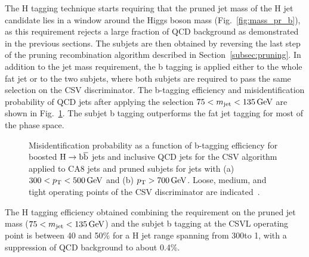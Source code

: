 The H tagging technique starts requiring that the pruned jet mass of the H jet candidate lies in a window around the Higgs boson mass (Fig.~\ref{fig:mass_pr_b}),
as this requirement rejects a large fraction of QCD background as demonstrated in the previous sections.
The subjets are then obtained by reversing the last step of the pruning recombination algorithm described in Section~\ref{subsec:pruning}.
In addition to the jet mass requirement, the b tagging is applied either to the whole fat jet or to the two subjets, where both subjets are required
to pass the same selection on the CSV discriminator. The b-tagging efficiency and misidentification probability of QCD jets after applying the selection $75 < m_{\text{jet}} < 135\,\text{Ge\hspace{-.08em}V}$ are shown in Fig.~\ref{fig:htagging8TeV}.
The subjet b tagging outperforms the fat jet tagging for most of the phase space.

\begin{figure}[!htb]
\centering     %
{}
 \caption{Misidentification probability as a function of b-tagging efficiency for boosted $\mathrm{H}\to{\mathrm{b}\overline{\mathrm{b}}}$ jets and inclusive QCD jets for the CSV algorithm applied to CA8 jets
 and pruned subjets for jets with (a) $300 < p_{\mathrm{T}} < 500\,\text{Ge\hspace{-.08em}V}$ and (b) $p_{\mathrm{T}} > 700\,\text{Ge\hspace{-.08em}V}$. Loose, medium, and tight operating points of the CSV discriminator are indicated~\cite{CMS:BTV13001}.}
\label{fig:htagging8TeV}
\end{figure}

The H tagging efficiency obtained combining the requirement on the pruned jet mass ($75 < m_{\text{jet}} < 135\,\text{Ge\hspace{-.08em}V}$)
and the subjet b tagging at the CSVL operating point is between 40 and 50\% for a H jet \pt range spanning from 300\GeV to 1\TeV,
with a suppression of QCD background to about 0.4\%.\\

